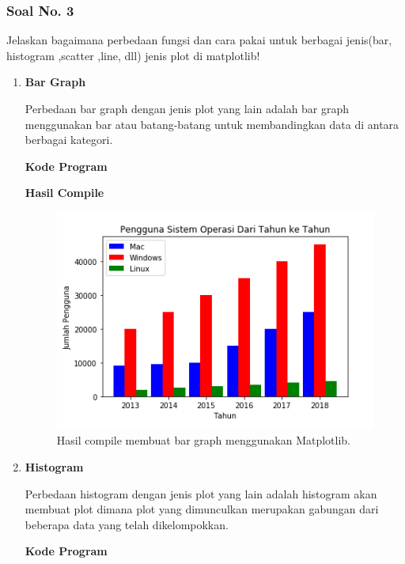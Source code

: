 \subsubsection{Soal No. 3}
\hfill \break
Jelaskan bagaimana perbedaan fungsi dan cara pakai untuk berbagai jenis(bar, histogram ,scatter ,line, dll) jenis plot di matplotlib!

\begin{enumerate}
	\item \textbf{Bar Graph}
	
	Perbedaan bar graph dengan jenis plot yang lain adalah bar graph menggunakan bar atau batang-batang untuk membandingkan data di antara berbagai kategori.
	
	\textbf{Kode Program}
	
	
	
	\textbf{Hasil Compile}
	
	\begin{figure}[H]
		\includegraphics[width=12cm]{figures/6/1174034/Teori/bar.png}
		\centering
		\caption{Hasil compile membuat bar graph menggunakan Matplotlib.}
	\end{figure}
	
	\item \textbf{Histogram}
	
	Perbedaan histogram dengan jenis plot yang lain adalah histogram akan membuat plot dimana plot yang dimunculkan merupakan gabungan dari beberapa data yang telah dikelompokkan.
	
	\textbf{Kode Program}
	
	
	

\end{enumerate}
